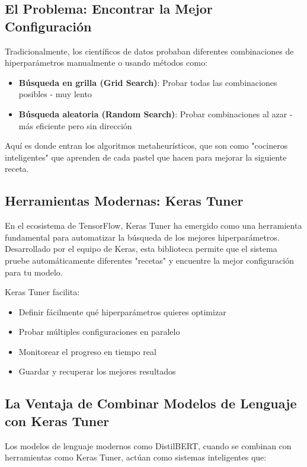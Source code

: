 \subsection{El Problema: Encontrar la Mejor Configuración}

Tradicionalmente, los científicos de datos probaban diferentes combinaciones de hiperparámetros manualmente o usando métodos como:

\begin{itemize}
    \item \textbf{Búsqueda en grilla (Grid Search)}: Probar todas las combinaciones posibles - muy lento
    \item \textbf{Búsqueda aleatoria (Random Search)}: Probar combinaciones al azar - más eficiente pero sin dirección
\end{itemize}

Aquí es donde entran los algoritmos metaheurísticos, que son como "cocineros inteligentes" que aprenden de cada pastel que hacen para mejorar la siguiente receta.

\subsection{Herramientas Modernas: Keras Tuner}

En el ecosistema de TensorFlow, Keras Tuner \cite{omalley2020hyperparameter} ha emergido como una herramienta fundamental para automatizar la búsqueda de los mejores hiperparámetros. Desarrollado por el equipo de Keras, esta biblioteca permite que el sistema pruebe automáticamente diferentes "recetas" y encuentre la mejor configuración para tu modelo.

Keras Tuner facilita:
\begin{itemize}
    \item Definir fácilmente qué hiperparámetros quieres optimizar
    \item Probar múltiples configuraciones en paralelo
    \item Monitorear el progreso en tiempo real
    \item Guardar y recuperar los mejores resultados
\end{itemize}

\subsection{La Ventaja de Combinar Modelos de Lenguaje con Keras Tuner}

Los modelos de lenguaje modernos como DistilBERT, cuando se combinan con herramientas como Keras Tuner, actúan como sistemas inteligentes que:

